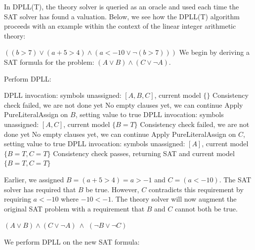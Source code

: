 \documentclass[a4paper,openany,12pt]{book}
\begin{document}
In DPLL(T), the theory solver is queried as an oracle and used each time the SAT solver has found a valuation.
Below, we see how the DPLL(T) algorithm proceeds with an example within the context of the linear integer arithmetic
theory:

\begin{example}{$((b > 7) \lor (a + 5 > 4) \land (a < -10 \lor \neg (b > 7)))$}
    We begin by deriving a SAT formula for the problem: $(A \lor B) \land (C \lor \neg A)$.

    Perform DPLL:

    \begin{outline}
        \1[\cogs] DPLL invocation: symbols unassigned: $[A, B, C]$, current model $\{\}$
        \1[\arrow] Consistency check failed, we are not done yet
        \1[\arrow] No empty clauses yet, we can continue
        \1[\arrow] Apply PureLiteralAssign on $B$, setting value to true
        \2[\cogs] DPLL invocation: symbols unassigned: $[A, C]$, current model $\{B=T\}$
        \2[\arrow] Consistency check failed, we are not done yet
        \2[\arrow] No empty clauses yet, we can continue
        \2[\arrow] Apply PureLiteralAssign on $C$, setting value to true
        \3[\cogs] DPLL invocation: symbols unassigned: $[A]$, current model\\ $\{B=T, C=T\}$
        \3[\checkMark] Consistency check passes, returning SAT and current model\\ $\{B=T, C=T\}$
    \end{outline}


    Earlier, we assigned $B = (a + 5 > 4) = a > -1$ and $C = (a < -10)$.
    The SAT solver has required that $B$ be true.
    However, $C$ contradicts this requirement by requiring $a < -10$ where $-10 < -1$.
    The theory solver will now augment the original SAT problem with a requirement that $B$ and $C$ cannot both be true.

    \((A \lor B) \land (C \lor \neg A)~\land \) \colorbox{white}{$(\neg B \lor \neg C)$}

    We perform DPLL on the new SAT formula:


\end{example}
\end{document}
